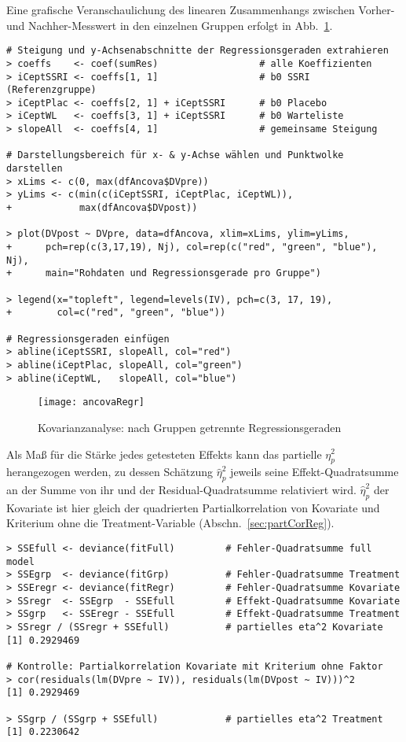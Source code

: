 Eine grafische Veranschaulichung des linearen Zusammenhangs zwischen Vorher- und Nachher-Messwert in den einzelnen Gruppen erfolgt in Abb.\ \ref{fig:ancovaRegr}.
\begin{lstlisting}
# Steigung und y-Achsenabschnitte der Regressionsgeraden extrahieren
> coeffs    <- coef(sumRes)                  # alle Koeffizienten
> iCeptSSRI <- coeffs[1, 1]                  # b0 SSRI (Referenzgruppe)
> iCeptPlac <- coeffs[2, 1] + iCeptSSRI      # b0 Placebo
> iCeptWL   <- coeffs[3, 1] + iCeptSSRI      # b0 Warteliste
> slopeAll  <- coeffs[4, 1]                  # gemeinsame Steigung

# Darstellungsbereich für x- & y-Achse wählen und Punktwolke darstellen
> xLims <- c(0, max(dfAncova$DVpre))
> yLims <- c(min(c(iCeptSSRI, iCeptPlac, iCeptWL)),
+            max(dfAncova$DVpost))

> plot(DVpost ~ DVpre, data=dfAncova, xlim=xLims, ylim=yLims,
+      pch=rep(c(3,17,19), Nj), col=rep(c("red", "green", "blue"), Nj),
+      main="Rohdaten und Regressionsgerade pro Gruppe")

> legend(x="topleft", legend=levels(IV), pch=c(3, 17, 19),
+        col=c("red", "green", "blue"))

# Regressionsgeraden einfügen
> abline(iCeptSSRI, slopeAll, col="red")
> abline(iCeptPlac, slopeAll, col="green")
> abline(iCeptWL,   slopeAll, col="blue")
\end{lstlisting}

\begin{figure}[ht]
\centering
\texttt{[image: ancovaRegr]}
\vspace*{-0.5em}
\caption{Kovarianzanalyse: nach Gruppen getrennte Regressionsgeraden}
\label{fig:ancovaRegr}
\end{figure}

Als Maß für die Stärke jedes getesteten Effekts kann das partielle $\eta_{p}^{2}$ herangezogen werden, zu dessen Schätzung $\hat{\eta}_{p}^{2}$ jeweils seine Effekt-Quadratsumme an der Summe von ihr und der Residual-Quadratsumme relativiert wird. $\hat{\eta}_{p}^{2}$ der Kovariate ist hier gleich der quadrierten Partialkorrelation von Kovariate und Kriterium ohne die Treatment-Variable (Abschn.\ \ref{sec:partCorReg}).
\begin{lstlisting}
> SSEfull <- deviance(fitFull)         # Fehler-Quadratsumme full model
> SSEgrp  <- deviance(fitGrp)          # Fehler-Quadratsumme Treatment
> SSEregr <- deviance(fitRegr)         # Fehler-Quadratsumme Kovariate
> SSregr  <- SSEgrp  - SSEfull         # Effekt-Quadratsumme Kovariate
> SSgrp   <- SSEregr - SSEfull         # Effekt-Quadratsumme Treatment
> SSregr / (SSregr + SSEfull)          # partielles eta^2 Kovariate
[1] 0.2929469

# Kontrolle: Partialkorrelation Kovariate mit Kriterium ohne Faktor
> cor(residuals(lm(DVpre ~ IV)), residuals(lm(DVpost ~ IV)))^2
[1] 0.2929469

> SSgrp / (SSgrp + SSEfull)            # partielles eta^2 Treatment
[1] 0.2230642
\end{lstlisting}

